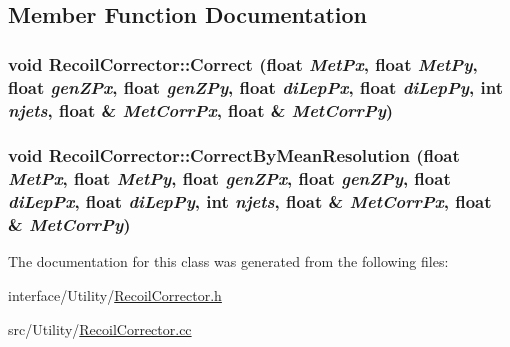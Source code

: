 \subsection{Member Function Documentation}
\hypertarget{classRecoilCorrector_ae8178d7b99dcccea02201be51195de63}{
\subsubsection[{Correct}]{\setlength{\rightskip}{0pt plus 5cm}void RecoilCorrector::Correct (float {\em MetPx}, \/  float {\em MetPy}, \/  float {\em genZPx}, \/  float {\em genZPy}, \/  float {\em diLepPx}, \/  float {\em diLepPy}, \/  int {\em njets}, \/  float \& {\em MetCorrPx}, \/  float \& {\em MetCorrPy})}}
\label{classRecoilCorrector_ae8178d7b99dcccea02201be51195de63}
\hypertarget{classRecoilCorrector_a1b24ca9f6e1c4b25bb0daf52cbebbdfa}{
\subsubsection[{CorrectByMeanResolution}]{\setlength{\rightskip}{0pt plus 5cm}void RecoilCorrector::CorrectByMeanResolution (float {\em MetPx}, \/  float {\em MetPy}, \/  float {\em genZPx}, \/  float {\em genZPy}, \/  float {\em diLepPx}, \/  float {\em diLepPy}, \/  int {\em njets}, \/  float \& {\em MetCorrPx}, \/  float \& {\em MetCorrPy})}}
\label{classRecoilCorrector_a1b24ca9f6e1c4b25bb0daf52cbebbdfa}


The documentation for this class was generated from the following files:\begin{DoxyCompactItemize}
\item 
interface/Utility/\hyperlink{RecoilCorrector_8h}{RecoilCorrector.h}\item 
src/Utility/\hyperlink{RecoilCorrector_8cc}{RecoilCorrector.cc}\end{DoxyCompactItemize}
